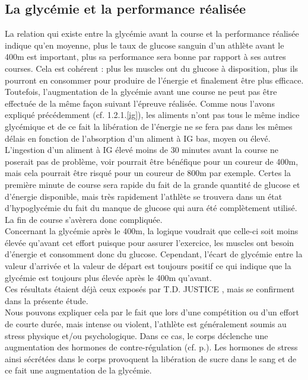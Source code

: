          
        \subsection{La glycémie et la performance réalisée}
    
            La relation qui existe entre la glycémie avant la course et la performance réalisée indique qu'en moyenne, plus le taux de glucose sanguin d'un athlète avant le 400m est important, plus sa performance sera bonne par rapport à ses autres courses. Cela est cohérent : plus les muscles ont du glucose à disposition, plus ils pourront en consommer pour produire de l'énergie et finalement être plus efficace.\\
                
            Toutefois, l'augmentation de la glycémie avant une course ne peut pas être effectuée de la même façon suivant l'épreuve réalisée. Comme nous l'avons expliqué précédemment (cf. 1.2.1.\ref{ig}), les aliments n'ont pas tous le même indice glycémique et de ce fait la libération de l'énergie ne se fera pas dans les mêmes délais en fonction de l'absorption d'un aliment à IG bas, moyen ou élevé. L'ingestion d'un aliment à IG élevé moins de 30 minutes avant la course ne poserait pas de problème, voir pourrait être bénéfique pour un coureur de 400m, mais cela pourrait être risqué pour un coureur de 800m par exemple. Certes la première minute de course sera rapide du fait de la grande quantité de glucose et d'énergie disponible, mais très rapidement l'athlète se trouvera dans un état d'hypoglycémie du fait du manque de glucose qui aura été complètement utilisé. La fin de course s'avèrera donc compliquée.\\
                
            Concernant la glycémie après le 400m, la logique voudrait que celle-ci soit moins élevée qu'avant cet effort puisque pour assurer l'exercice, les muscles ont besoin d'énergie et consomment donc du glucose. Cependant, l'écart de glycémie entre la valeur d'arrivée et la valeur de départ est toujours positif ce qui indique que la glycémie est toujours plus élevée après le 400m qu'avant.\\
            
            Ces résultats étaient déjà ceux exposés par T.D. JUSTICE \cite{justice15}, mais se confirment dans la présente étude.\\
                
            Nous pouvons expliquer cela par le fait que lors d'une compétition ou d'un effort de courte durée, mais intense ou violent, l'athlète est généralement soumis au stress physique et/ou psychologique. Dans ce cas, le corps déclenche une augmentation des hormones de contre-régulation (cf. p.\pageref{glycemie}). Les hormones de stress ainsi sécrétées dans le corps provoquent la libération de sucre dans le sang et de ce fait une augmentation de la glycémie.\\
            
